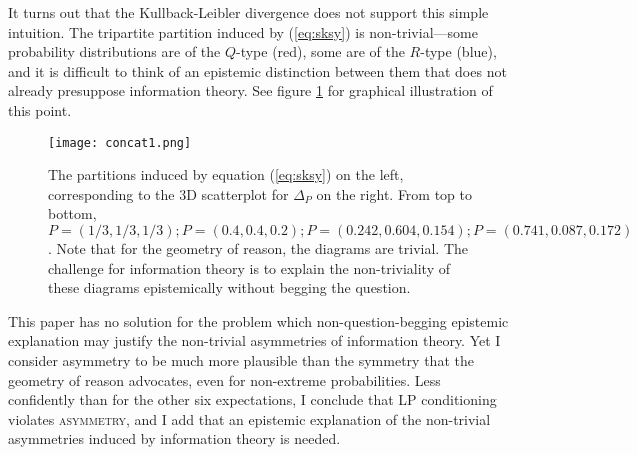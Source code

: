 \documentclass[11pt]{article} \usepackage{october} \onehalfspacing
\begin{document}
It turns out that the Kullback-Leibler divergence does not support
this simple intuition. The tripartite partition induced by
(\ref{eq:sksy}) is non-trivial---some probability distributions are of
the $Q$-type (red), some are of the $R$-type (blue), and it is
difficult to think of an epistemic distinction between them that does
not already presuppose information theory. See figure \ref{fig:concat}
for graphical illustration of this point.

\begin{figure}[ht]
  \begin{flushright}
    \begin{minipage}[h]{.82\linewidth}
      \texttt{[image: concat1.png]}
      \caption{\footnotesize The partitions induced by equation
        (\ref{eq:sksy}) on the left, corresponding to the 3D
        scatterplot for $\Delta_{P}$ on the right. From top to bottom,
        $P=(1/3,1/3,1/3); P=(0.4,0.4,0.2); P=(0.242,0.604,0.154);
        P=(0.741,0.087,0.172)$.
        Note that for the geometry of reason, the diagrams are
        trivial. The challenge for information theory is to explain
        the non-triviality of these diagrams epistemically without
        begging the question.}
      \label{fig:concat}
    \end{minipage}
  \end{flushright}
\end{figure}

This paper has no solution for the problem which non-question-begging
epistemic explanation may justify the non-trivial asymmetries of
information theory. Yet I consider asymmetry to be much more plausible
than the symmetry that the geometry of reason advocates, even for
non-extreme probabilities. Less confidently than for the other six
expectations, I conclude that LP conditioning violates
\textsc{asymmetry}, and I add that an epistemic explanation of the
non-trivial asymmetries induced by information theory is needed.

 
\end{document}
